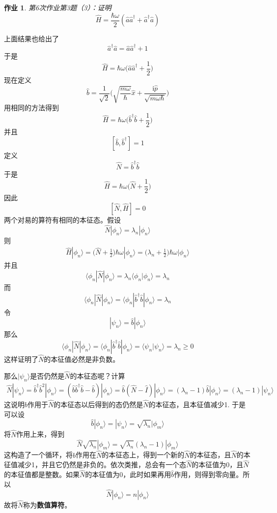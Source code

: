 \documentclass[12pt]{article}
\newtheorem{asg}{作业}
\begin{document}
\begin{asg}
    第6次作业第3题（3）：证明
    \[ \hat{H} = \frac {\hbar \omega}2 (\hat{a}\hat{a}^\dagger + \hat{a}^\dagger \hat{a}) \]
\end{asg}
上面结果也给出了
\[ \hat{a}^\dagger\hat{a} = \hat{a}\hat{a}^\dagger + 1 \]
于是
\[ \hat{H} = \hbar \omega\bigg(\hat{a}\hat{a}^\dagger + \frac 12\bigg)\]
现在定义
\[ \hat{b} = \frac 1{\sqrt{2}}\bigg(\sqrt{\frac {m\omega}{\hbar}}\hat{x} + \frac {\mathrm{i}\hat{p}}{\sqrt{m\omega\hbar}}\bigg) \]
用相同的方法得到 
\[ \hat{H} = \hbar \omega\bigg(\hat{b}^\dagger\hat{b}+ \frac 12\bigg) \]
并且
\[ [\hat{b}, \hat{b}^\dagger] = 1 \]
定义
\[ \hat{N} = \hat{b}^\dagger\hat{b} \]
于是
\[ \hat{H} = \hbar \omega \bigg(\hat{N}+\frac 12\bigg) \]
因此 
\[ [\hat{N},\hat{H}] = 0 \]
两个对易的算符有相同的本征态。假设
\[ \hat{N}|\phi_n \rangle = \lambda_n |\phi_n \rangle \]
则
\begin{align*}
    \hat{H}|\phi_n \rangle = \bigg(\hat{N}+\frac 12\bigg)\hbar\omega|\phi_n \rangle = \bigg(\lambda_n + \frac 12\bigg)\hbar\omega|\phi_n\rangle
\end{align*}
并且
\[ \langle \phi_n|\hat{N}|\phi_n \rangle = \lambda_n \langle \phi_n |\phi_n \rangle = \lambda_n \]
而
\[ \langle \phi_n|\hat{N}|\phi_n \rangle =  \langle \phi_n |\hat{b}^\dagger\hat{b}|\phi_n \rangle = \lambda_n \]
令
\[ |\psi_n \rangle = \hat{b}|\phi_n\rangle \]
那么
\[ \langle \phi_n|\hat{N}|\phi_n \rangle =  \langle \phi_n |\hat{b}^\dagger\hat{b}|\phi_n \rangle = \langle \psi_n|\psi_n \rangle = \lambda_n \geqslant 0 \]
这样证明了$\hat{N}$的本征值必然是非负数。

那么$|\psi_n\rangle$是否仍然是$\hat{N}$的本征态呢？计算
\begin{align*}
    \hat{N}|\psi_n\rangle = \hat{b}^\dagger\hat{b}^2|\phi_n\rangle = (\hat{b}\hat{b}^\dagger\hat{b}- \hat{b})|\phi_n\rangle = \hat{b}(\hat{N}-\hat{I})|\phi_n\rangle = (\lambda_n-1)\hat{b}|\phi_n\rangle = (\lambda_n - 1)|\psi_n\rangle
\end{align*}
这说明$\hat{b}$作用于$\hat{N}$的本征态以后得到的态仍然是$\hat{N}$的本征态，且本征值减少1. 于是可以设
\[ \hat{b}|\phi_n\rangle = |\psi_n\rangle = \sqrt{\lambda_n}|\phi_m\rangle \]
将$\hat{N}$作用上来，得到
\[ \hat{N}\sqrt{\lambda_n}|\phi_m \rangle = \sqrt{\lambda_n}(\lambda_n-1)|\phi_m\rangle \]
这构造了一个循环，将$\hat{b}$作用在$\hat{N}$的本征态上，得到一个新的$\hat{N}$的本征态，且$\hat{N}$的本征值减少1，并且它仍然是非负的。依次类推，总会有一个态$\hat{N}$的本征值为0，且$\hat{N}$的本征值都是整数。如果$\hat{N}$的本征值为0，此时如果再用$\hat{b}$作用，则得到零向量。所以
\[ \hat{N}|\phi_n \rangle = n|\phi_n\rangle \]
故将$\hat{N}$称为\textbf{数值算符}。
\end{document}

